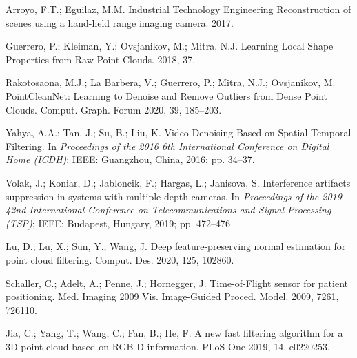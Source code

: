 \begin{thebibliography}{9}
Arroyo, F.T.; Eguilaz, M.M. Industrial Technology Engineering Reconstruction of scenes using a hand-held range imaging camera. 2017.

Guerrero, P.; Kleiman, Y.; Ovsjanikov, M.; Mitra, N.J. Learning Local Shape Properties from Raw Point Clouds. 2018, 37.

Rakotosaona, M.J.; La Barbera, V.; Guerrero, P.; Mitra, N.J.; Ovsjanikov, M. PointCleanNet: Learning to Denoise and Remove Outliers from Dense Point Clouds. Comput. Graph. Forum 2020, 39, 185–203.

Yahya, A.A.; Tan, J.; Su, B.; Liu, K. Video Denoising Based on Spatial-Temporal Filtering. In {\em Proceedings of the 2016 6th International Conference on Digital Home (ICDH)}; IEEE: Guangzhou, China, 2016; pp. 34–37.

Volak, J.; Koniar, D.; Jabloncik, F.; Hargas, L.; Janisova, S. Interference artifacts suppression in systems with multiple depth cameras. In {\em Proceedings of the 2019 42nd International Conference on Telecommunications and Signal Processing (TSP)}; IEEE: Budapest, Hungary, 2019; pp. 472–476

Lu, D.; Lu, X.; Sun, Y.; Wang, J. Deep feature-preserving normal estimation for point cloud filtering. Comput. Des. 2020, 125, 102860.

Schaller, C.; Adelt, A.; Penne, J.; Hornegger, J. Time-of-Flight sensor for patient positioning. Med. Imaging 2009 Vis. Image-Guided Proced. Model. 2009, 7261, 726110.

Jia, C.; Yang, T.; Wang, C.; Fan, B.; He, F. A new fast filtering algorithm for a 3D point cloud based on RGB-D information. PLoS One 2019, 14, e0220253.

\end{thebibliography}